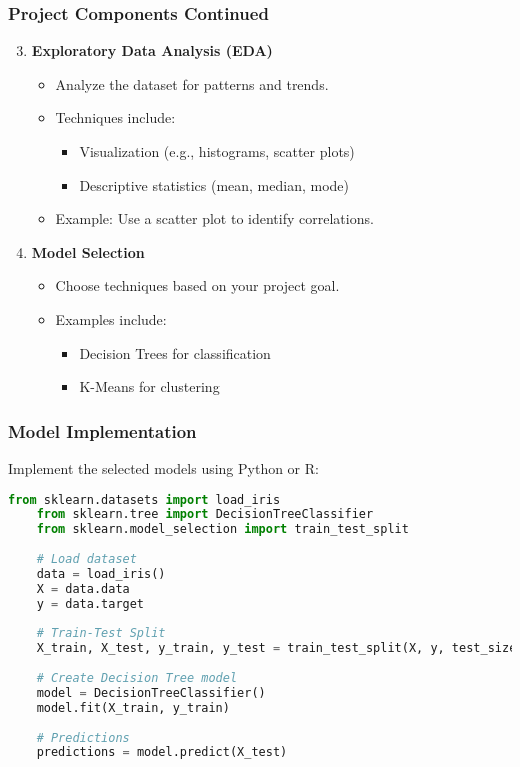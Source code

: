 \documentclass[aspectratio=169]{beamer}
\begin{document}
\begin{frame}
    \frametitle{Project Components Continued}
    \begin{enumerate}
        \setcounter{enumi}{2} %
        \item \textbf{Exploratory Data Analysis (EDA)}
            \begin{itemize}
                \item Analyze the dataset for patterns and trends.
                \item Techniques include:
                    \begin{itemize}
                        \item Visualization (e.g., histograms, scatter plots)
                        \item Descriptive statistics (mean, median, mode)
                    \end{itemize}
                \item Example: Use a scatter plot to identify correlations.
            \end{itemize}
        
        \item \textbf{Model Selection}
            \begin{itemize}
                \item Choose techniques based on your project goal.
                \item Examples include:
                    \begin{itemize}
                        \item Decision Trees for classification
                        \item K-Means for clustering
                    \end{itemize}
            \end{itemize}
    \end{enumerate}
\end{frame}

\begin{frame}[fragile]
    \frametitle{Model Implementation}
    Implement the selected models using Python or R:
    
    \begin{lstlisting}[language=Python]
    from sklearn.datasets import load_iris
    from sklearn.tree import DecisionTreeClassifier
    from sklearn.model_selection import train_test_split
    
    # Load dataset
    data = load_iris()
    X = data.data
    y = data.target
    
    # Train-Test Split
    X_train, X_test, y_train, y_test = train_test_split(X, y, test_size=0.3, random_state=42)
    
    # Create Decision Tree model
    model = DecisionTreeClassifier()
    model.fit(X_train, y_train)
    
    # Predictions
    predictions = model.predict(X_test)
    \end{lstlisting}
\end{frame}
\end{document}
